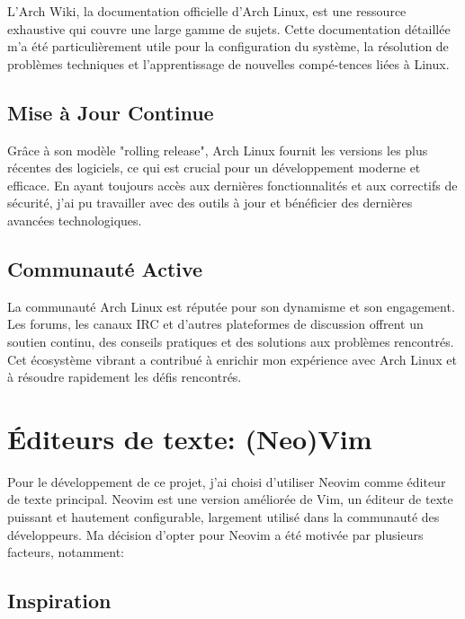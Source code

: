 \hspace{16pt}L'Arch Wiki, la documentation officielle d'Arch Linux, est une ressource exhaustive qui couvre une large gamme de sujets. Cette documentation détaillée m'a été particulièrement utile pour la configuration du système, la résolution de problèmes techniques et l'apprentissage de nouvelles compé-tences liées à Linux.

\subsection{Mise à Jour Continue}

\hspace{16pt}Grâce à son modèle "rolling release", Arch Linux fournit les versions les plus récentes des logiciels, ce qui est crucial pour un développement moderne et efficace. En ayant toujours accès aux dernières fonctionnalités et aux correctifs de sécurité, j'ai pu travailler avec des outils à jour et bénéficier des dernières avancées technologiques.

\subsection{Communauté Active}

\hspace{16pt}La communauté Arch Linux est réputée pour son dynamisme et son engagement. Les forums, les canaux IRC et d'autres plateformes de discussion offrent un soutien continu, des conseils pratiques et des solutions aux problèmes rencontrés. Cet écosystème vibrant a contribué à enrichir mon expérience avec Arch Linux et à résoudre rapidement les défis rencontrés.


\section{Éditeurs de texte: (Neo)Vim}

\hspace{16pt}Pour le développement de ce projet, j'ai choisi d'utiliser Neovim comme éditeur de texte principal. Neovim est une version améliorée de Vim, un éditeur de texte puissant et hautement configurable, largement utilisé dans la communauté des développeurs. Ma décision d'opter pour Neovim a été motivée par plusieurs facteurs, notamment:

\subsection{Inspiration}

